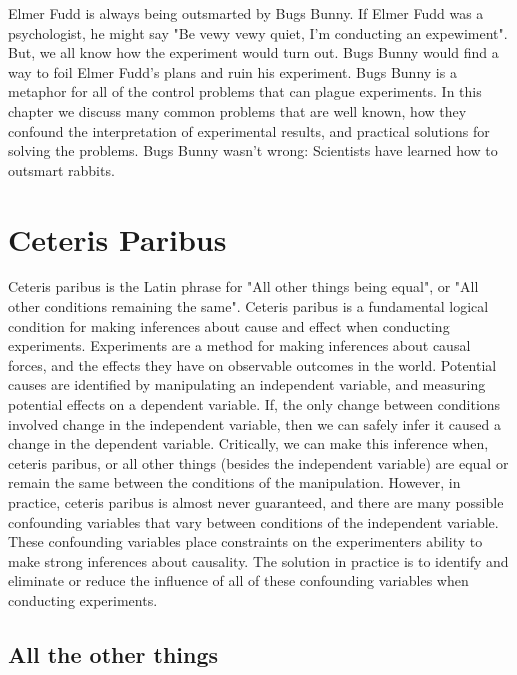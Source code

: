 

Elmer Fudd is always being outsmarted by Bugs Bunny. If Elmer Fudd was a psychologist, he might say "Be vewy vewy quiet, I'm conducting an expewiment". But, we all know how the experiment would turn out. Bugs Bunny would find a way to foil Elmer Fudd's plans and ruin his experiment. Bugs Bunny is a metaphor for all of the control problems that can plague experiments. In this chapter we discuss many common problems that are well known, how they confound the interpretation of experimental results, and practical solutions for solving the problems. Bugs Bunny wasn't wrong: Scientists have learned how to outsmart rabbits.

\section{Ceteris Paribus}

Ceteris paribus is the Latin phrase for "All other things being equal", or "All other conditions remaining the same". Ceteris paribus is a fundamental logical condition for making inferences about cause and effect when conducting experiments. Experiments are a method for making inferences about causal forces, and the effects they have on observable outcomes in the world. Potential causes are identified by manipulating an independent variable, and measuring potential effects on a dependent variable. If, the only change between conditions involved change in the independent variable, then we can safely infer it caused a change in the dependent variable. Critically, we can make this inference when, ceteris paribus, or all other things (besides the independent variable) are equal or remain the same between the conditions of the manipulation. However, in practice, ceteris paribus is almost never guaranteed, and there are many possible confounding variables that vary between conditions of the independent variable. These confounding variables place constraints on the experimenters ability to make strong inferences about causality. The solution in practice is to identify and eliminate or reduce the influence of all of these confounding variables when conducting experiments.

\subsection{All the other things}


